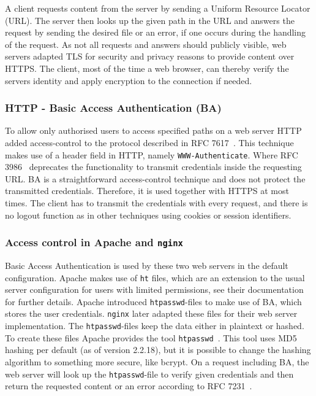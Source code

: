 A client requests content from the server by sending a Uniform Resource Locator
(URL). The server then looks up the given path in the URL and answers the
request by sending the desired file or an error, if one occurs during the
handling of the request. As not all requests and answers should publicly
visible, web servers adapted TLS for security and privacy reasons to provide
content over HTTPS. The client, most of the time a web browser, can thereby
verify the server\textquotesingle s identity and apply encryption to the
connection if needed.

\subsubsection{HTTP - Basic Access Authentication (BA)}

To allow only authorised users to access specified paths on a web server HTTP
added access-control to the protocol described in RFC 7617~\cite{rfc7617}. This
technique makes use of a header field in HTTP, namely \texttt{WWW-Authenticate}.
Where RFC 3986~\cite{rfc3986} deprecates the functionality to transmit
credentials inside the requesting URL. BA is a straightforward access-control
technique and does not protect the transmitted credentials. Therefore, it is
used together with HTTPS at most times. The client has to transmit the
credentials with every request, and there is no logout function as in other
techniques using cookies or session identifiers.

\subsubsection{Access control in Apache and \texttt{nginx}}

Basic Access Authentication is used by these two web servers in the default
configuration. Apache makes use of \texttt{ht} files, which are an extension to
the usual server configuration for users with limited permissions, see
their documentation~\cite{apacheauthdoc} for further details. Apache introduced
\texttt{htpasswd}-files to make use of BA, which stores the user credentials.
\texttt{nginx} later adapted these files for their web server implementation.
The \texttt{htpasswd}-files keep the data either in plaintext or hashed. To
create these files Apache provides the tool
\texttt{htpasswd}~\cite{htpasswddoc}. This tool uses MD5 hashing per default (as
of version 2.2.18), but it is possible to change the hashing algorithm to
something more secure, like bcrypt. On a request including BA, the web server
will look up the \texttt{htpasswd}-file to verify given credentials and then
return the requested content or an error according to RFC 7231~\cite{rfc7231}.

